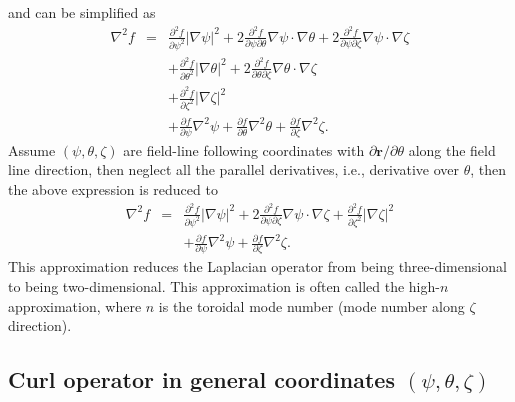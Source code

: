 \documentclass{article}
\begin{document}
and can be simplified as
\begin{eqnarray}
  \nabla^2 f & = & \frac{\partial^2 f}{\partial \psi^2} | \nabla \psi |^2 + 2
  \frac{\partial^2 f}{\partial \psi \partial \theta} \nabla \psi \cdot \nabla
  \theta + 2 \frac{\partial^2 f}{\partial \psi \partial \zeta} \nabla \psi
  \cdot \nabla \zeta \nonumber\\
  &  & + \frac{\partial^2 f}{\partial \theta^2} | \nabla \theta |^2 + 2
  \frac{\partial^2 f}{\partial \theta \partial \zeta} \nabla \theta \cdot
  \nabla \zeta \nonumber\\
  &  & + \frac{\partial^2 f}{\partial \zeta^2} | \nabla \zeta |^2 \nonumber\\
  &  & + \frac{\partial f}{\partial \psi} \nabla^2 \psi + \frac{\partial
  f}{\partial \theta} \nabla^2 \theta + \frac{\partial f}{\partial \zeta}
  \nabla^2 \zeta . 
\end{eqnarray}
Assume $(\psi, \theta, \zeta)$ are field-line following coordinates with
$\partial \mathbf{r}/ \partial \theta$ along the field line direction, then
neglect all the parallel derivatives, i.e., derivative over $\theta$, then the
above expression is reduced to
\begin{eqnarray}
  \nabla^2 f & = & \frac{\partial^2 f}{\partial \psi^2} | \nabla \psi |^2 + 2
  \frac{\partial^2 f}{\partial \psi \partial \zeta} \nabla \psi \cdot \nabla
  \zeta + \frac{\partial^2 f}{\partial \zeta^2} | \nabla \zeta |^2 \nonumber\\
  &  & + \frac{\partial f}{\partial \psi} \nabla^2 \psi + \frac{\partial
  f}{\partial \zeta} \nabla^2 \zeta . 
\end{eqnarray}
This approximation reduces the Laplacian operator from being three-dimensional
to being two-dimensional. This approximation is often called the high-$n$
approximation, where $n$ is the toroidal mode number (mode number along
$\zeta$ direction).

\subsection{Curl operator in general coordinates $(\psi, \theta, \zeta)$}
\end{document}

